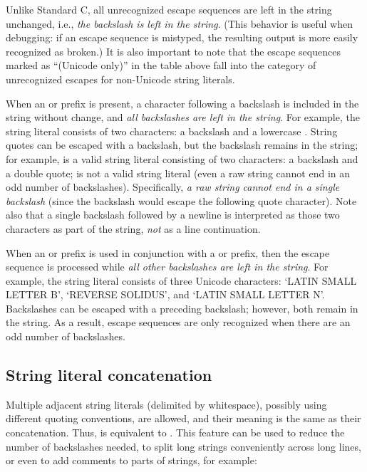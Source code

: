Unlike Standard C,
all unrecognized escape sequences are left in the string unchanged,
i.e., \emph{the backslash is left in the string}.  (This behavior is
useful when debugging: if an escape sequence is mistyped, the
resulting output is more easily recognized as broken.)  It is also
important to note that the escape sequences marked as ``(Unicode
only)'' in the table above fall into the category of unrecognized
escapes for non-Unicode string literals.

When an  or  prefix is present, a character
following a backslash is included in the string without change, and \emph{all
backslashes are left in the string}.  For example, the string literal
 consists of two characters: a backslash and a lowercase
.  String quotes can be escaped with a backslash, but the
backslash remains in the string; for example,  is a valid string
literal consisting of two characters: a backslash and a double quote;
 is not a valid string literal (even a raw string cannot
end in an odd number of backslashes).  Specifically, \emph{a raw
string cannot end in a single backslash} (since the backslash would
escape the following quote character).  Note also that a single
backslash followed by a newline is interpreted as those two characters
as part of the string, \emph{not} as a line continuation.

When an  or  prefix is used in conjunction
with a  or  prefix, then the 
escape sequence is processed while \emph{all other backslashes are
left in the string}.  For example, the string literal
 consists of three Unicode characters: `LATIN
SMALL LETTER B', `REVERSE SOLIDUS', and `LATIN SMALL LETTER N'.
Backslashes can be escaped with a preceding backslash; however, both
remain in the string.  As a result,  escape sequences
are only recognized when there are an odd number of backslashes.

\subsection{String literal concatenation\label{string-catenation}}

Multiple adjacent string literals (delimited by whitespace), possibly
using different quoting conventions, are allowed, and their meaning is
the same as their concatenation.  Thus,  is
equivalent to .  This feature can be used to reduce
the number of backslashes needed, to split long strings conveniently
across long lines, or even to add comments to parts of strings, for
example:

